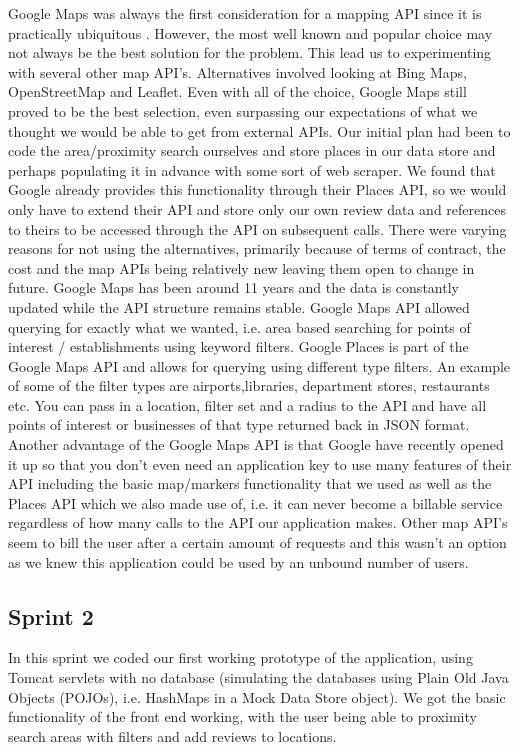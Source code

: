 Google Maps was always the first consideration for a mapping API since it is practically ubiquitous . However, the most well known and popular choice may not always be the best solution for the problem. This lead us to experimenting with several other map API’s. Alternatives involved looking at Bing Maps, OpenStreetMap and Leaflet. Even with all of the choice, Google Maps still proved to be the best selection, even surpassing our expectations of what we thought we would be able to get from external APIs. Our initial plan had been to code the area/proximity search ourselves and store places in our data store and perhaps populating it in advance with some sort of web scraper. We found that Google already provides this functionality through their Places API, so we would only have to extend their API and store only our own review data and references to theirs to be accessed through the API on subsequent calls. There were varying reasons for not using the alternatives, primarily because of terms of contract, the cost and the map APIs being relatively new leaving them open to change in future. Google Maps has been around 11 years and the data is constantly updated while the API structure remains stable. Google Maps API allowed querying for exactly what we wanted, i.e. area based searching for points of interest / establishments using keyword filters. Google Places is part of the Google Maps API and allows for querying using different type filters. An example of some of the filter types are airports,libraries, department stores, restaurants etc. You can pass in a location, filter set and a radius to the API and have all points of interest or businesses of that type returned back in JSON format. Another advantage of the Google Maps API is that Google have recently opened it up so that you don't even need an application key to use many features of their API including the basic map/markers functionality that we used as well as the Places API which we also made use of, i.e. it can never become a billable service regardless of how many calls to the API our application makes. Other map API's seem to bill the user after a certain amount of requests and this wasn't an option as we knew this application could be used by an unbound number of users.

\subsection{Sprint 2}
In this sprint we coded our first working prototype of the application, using Tomcat servlets with no database (simulating the databases using Plain Old Java Objects (POJOs), i.e. HashMaps in a Mock Data Store object). We got the basic functionality of the front end working, with the user being able to proximity search areas with filters and add reviews to locations.

